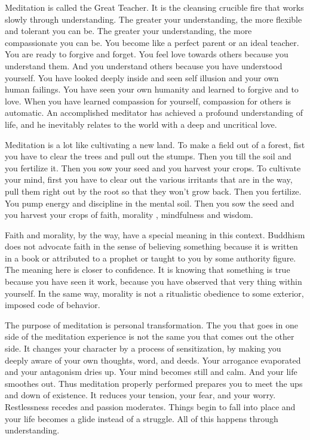 Meditation is called the Great Teacher. It is the cleansing crucible fire that
works slowly through understanding. The greater your understanding, the more
flexible and tolerant you can be. The greater your understanding, the more
compassionate you can be.  You become like a perfect parent or an ideal teacher.
You are ready to forgive and forget. You feel love towards others because you
understand them. And you understand others because you have understood yourself.
You have looked deeply inside and seen self illusion and your own human
failings. You have seen your own humanity and learned to forgive and to love.
When you have learned compassion for yourself, compassion for others is
automatic. An accomplished meditator has achieved a profound understanding of
life, and he inevitably relates to the world with a deep and uncritical love.

Meditation is a lot like cultivating a new land. To make a field out of a
forest, fist you have to clear the trees and pull out the stumps. Then you till
the soil and you fertilize it. Then you sow your seed and you harvest your
crops. To cultivate your mind, first you have to clear out the various irritants
that are in the way, pull them right out by the root so that they won't grow
back.  Then you fertilize. You pump energy and discipline in the mental soil.
Then you sow the seed and you harvest your crops of faith, morality ,
mindfulness and wisdom.

Faith and morality, by the way, have a special meaning in this context. Buddhism
does not advocate faith in the sense of believing something because it is
written in a book or attributed to a prophet or taught to you by some authority
figure. The meaning here is closer to confidence. It is knowing that something
is true because you have seen it work, because you have observed that very thing
within yourself. In the same way, morality is not a ritualistic obedience to
some exterior, imposed code of behavior.

The purpose of meditation is personal transformation. The you that goes in one
side of the meditation experience is not the same you that comes out the other
side. It changes your character by a process of sensitization, by making you
deeply aware of your own thoughts, word, and deeds. Your arrogance evaporated
and your antagonism dries up. Your mind becomes still and calm. And your life
smoothes out. Thus meditation properly performed prepares you to meet the ups
and down of existence. It reduces your tension, your fear, and your worry.
Restlessness recedes and passion moderates. Things begin to fall into place and
your life becomes a glide instead of a struggle. All of this happens through
understanding.


